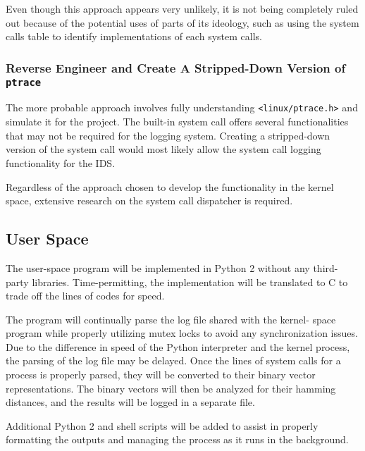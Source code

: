\documentclass[paper=usletter, fontsize=12pt]{article}
\begin{document}
    Even though this approach appears very unlikely, it is not being completely
    ruled out because of the potential uses of parts of its ideology, such as
    using the system calls table to identify implementations of each system
    calls.

    \subsubsection{Reverse Engineer and Create A Stripped-Down Version of
    \texttt{ptrace}} The more probable approach involves fully understanding
    \texttt{<linux/ptrace.h>} and simulate it for the project. The built-in
    system call offers several functionalities that may not be required for the
    logging system. Creating a stripped-down version of the system call would
    most likely allow the system call logging functionality for the IDS.

    Regardless of the approach chosen to develop the functionality in the
    kernel space, extensive research on the system call dispatcher is required.

    \subsection{User Space} The user-space program will be implemented in
    Python 2 without any third-party libraries. Time-permitting, the
    implementation will be translated to C to trade off the lines of codes for
    speed.

    The program will continually parse the log file shared with the kernel-
    space program while properly utilizing mutex locks to avoid any
    synchronization issues. Due to the difference in speed of the Python
    interpreter and the kernel process, the parsing of the log file may be
    delayed. Once the lines of system calls for a process is properly parsed,
    they will be converted to their binary vector representations. The binary
    vectors will then be analyzed for their hamming distances, and the results
    will be logged in a separate file.

    Additional Python 2 and shell scripts will be added to assist in properly
    formatting the outputs and managing the process as it runs in the
    background.
\end{document}
